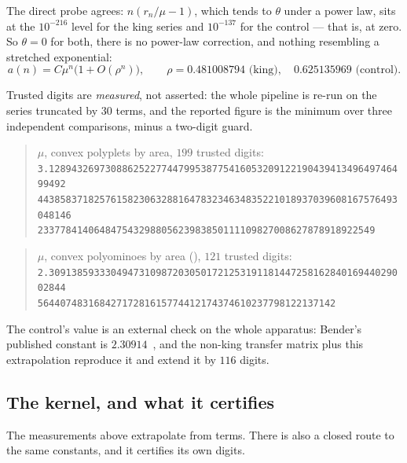 \documentclass[11pt]{article}
\begin{document}
The direct probe agrees: $n(r_n/\mu - 1)$, which tends to $\theta$ under a power
law, sits at the $10^{-216}$ level for the king series and $10^{-137}$ for the
control --- that is, at zero. So $\theta = 0$ for both, there is no power-law
correction, and nothing resembling a stretched exponential:
\[
  a(n) = C\mu^n\bigl(1 + O(\rho^n)\bigr), \qquad
  \rho = 0.481008794 \text{ (king)}, \quad 0.625135969 \text{ (control)}.
\]

Trusted digits are \emph{measured}, not asserted: the whole pipeline is re-run
on the series truncated by $30$ terms, and the reported figure is the minimum
over three independent comparisons, minus a two-digit guard.

\begin{quote}\small
$\mu$, convex polyplets by area, $199$ trusted digits:\\[2pt]
\texttt{3.1289432697308862522774479953877541605320912219043941349649746499492}\\
\texttt{4438583718257615823063288164783234634835221018937039608167576493048146}\\
\texttt{233778414064847543298805623983850111109827008627878918922549}
\end{quote}

\begin{quote}\small
$\mu$, convex polyominoes by area (), $121$ trusted digits:\\[2pt]
\texttt{2.3091385933304947310987203050172125319118144725816284016944029002844}\\
\texttt{56440748316842717281615774412174374610237798122137142}
\end{quote}

The control's value is an external check on the whole apparatus: Bender's
published constant is $2.30914$~\cite{bender1974}, and the non-king transfer
matrix plus this extrapolation reproduce it and extend it by $116$ digits.

\subsection{The kernel, and what it certifies}
\label{sec:kernel}

The measurements above extrapolate from terms. There is also a closed route to
the same constants, and it certifies its own digits.
\end{document}
